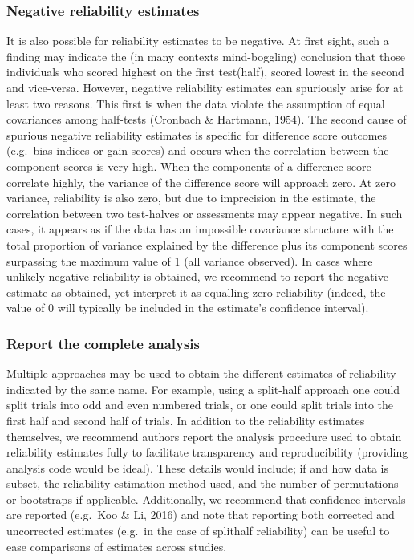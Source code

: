 \documentclass[english,,man,floatsintext]{apa6}
\begin{document}
\hypertarget{negative-reliability-estimates}{%
\subsubsection{Negative reliability estimates}\label{negative-reliability-estimates}}

It is also possible for reliability estimates to be negative. At first sight, such a finding may indicate the (in many contexts mind-boggling) conclusion that those individuals who scored highest on the first test(half), scored lowest in the second and vice-versa. However, negative reliability estimates can spuriously arise for at least two reasons. This first is when the data violate the assumption of equal covariances among half-tests (Cronbach \& Hartmann, 1954). The second cause of spurious negative reliability estimates is specific for difference score outcomes (e.g.~bias indices or gain scores) and occurs when the correlation between the component scores is very high. When the components of a difference score correlate highly, the variance of the difference score will approach zero. At zero variance, reliability is also zero, but due to imprecision in the estimate, the correlation between two test-halves or assessments may appear negative. In such cases, it appears as if the data has an impossible covariance structure with the total proportion of variance explained by the difference plus its component scores surpassing the maximum value of 1 (all variance observed). In cases where unlikely negative reliability is obtained, we recommend to report the negative estimate as obtained, yet interpret it as equalling zero reliability (indeed, the value of 0 will typically be included in the estimate's confidence interval).

\hypertarget{report-the-complete-analysis}{%
\subsubsection{Report the complete analysis}\label{report-the-complete-analysis}}

Multiple approaches may be used to obtain the different estimates of reliability indicated by the same name. For example, using a split-half approach one could split trials into odd and even numbered trials, or one could split trials into the first half and second half of trials. In addition to the reliability estimates themselves, we recommend authors report the analysis procedure used to obtain reliability estimates fully to facilitate transparency and reproducibility (providing analysis code would be ideal). These details would include; if and how data is subset, the reliability estimation method used, and the number of permutations or bootstraps if applicable. Additionally, we recommend that confidence intervals are reported (e.g.~Koo \& Li, 2016) and note that reporting both corrected and uncorrected estimates (e.g.~in the case of splithalf reliability) can be useful to ease comparisons of estimates across studies.
\end{document}
